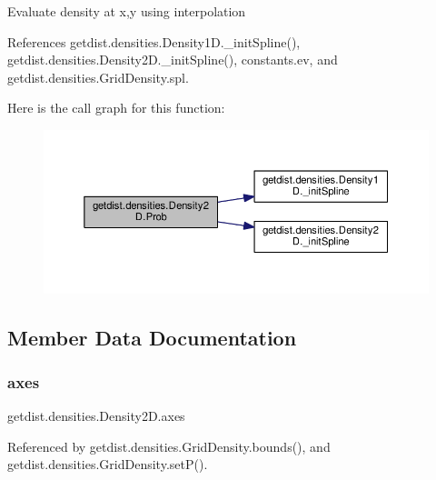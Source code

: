 \begin{DoxyVerb}Evaluate density at x,y using interpolation
\end{DoxyVerb}
 

References getdist.\+densities.\+Density1\+D.\+\_\+init\+Spline(), getdist.\+densities.\+Density2\+D.\+\_\+init\+Spline(), constants.\+ev, and getdist.\+densities.\+Grid\+Density.\+spl.

Here is the call graph for this function\+:
\nopagebreak
\begin{figure}[H]
\begin{center}
\leavevmode
\includegraphics[width=350pt]{classgetdist_1_1densities_1_1Density2D_a24e04a59b25556b75a32cc82272aef31_cgraph}
\end{center}
\end{figure}


\subsection{Member Data Documentation}
\mbox{\label{classgetdist_1_1densities_1_1Density2D_abafd7e697c4e194f88c207f71ba7ad8e}} 
\subsubsection{\texorpdfstring{axes}{axes}}
{\footnotesize\ttfamily getdist.\+densities.\+Density2\+D.\+axes}



Referenced by getdist.\+densities.\+Grid\+Density.\+bounds(), and getdist.\+densities.\+Grid\+Density.\+set\+P().

\mbox{\label{classgetdist_1_1densities_1_1Density2D_a22fb264fe6afdaf8a56e90b6e42e9eb4}} 
